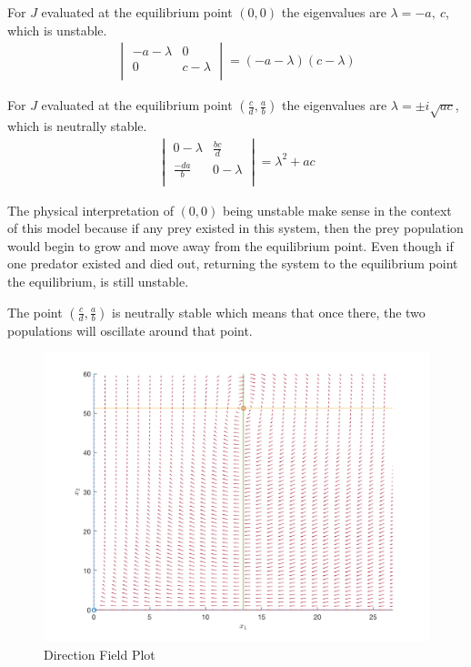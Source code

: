 \documentclass[12pt]{article}   %
\theoremstyle{definition}
\numberwithin{equation}{section}
\begin{document}
\quad For $J$ evaluated at the equilibrium point $(0,0)$ the eigenvalues are $\lambda=-a,\ c$, which is unstable.
\begin{align*}
  \begin{vmatrix}
    -a-\lambda &0\\
    0& c-\lambda\\
  \end{vmatrix}
  =(-a-\lambda)(c-\lambda)
\end{align*}

\quad For $J$ evaluated at the equilibrium point $(\frac{c}{d},\frac{a}{b})$ the eigenvalues are  $\lambda=\pm i\sqrt{ac}$, which is neutrally stable.
\begin{align*}
  \begin{vmatrix}
    0-\lambda & \frac{bc}{d}\\
    \frac{-da}{b} & 0-\lambda\\
  \end{vmatrix}
  =\lambda^2+ac
\end{align*}

\quad The physical interpretation of $(0,0)$ being unstable make sense in the context of this model because if any prey existed in this system, then the prey population would begin to grow and move away from the equilibrium point. Even though if one predator existed and died out, returning the system to the equilibrium point the equilibrium, is still unstable. 

\quad The point $(\frac{c}{d},\frac{a}{b})$ is neutrally stable which means that once there, the two populations will oscillate around that point.  

\begin{figure} [h] 
  \centering
  \includegraphics[width=15cm]{images/dirfield.png}
  \caption{Direction Field Plot}
  \label{fig:dirfield}
\end{figure}
\end{document}
